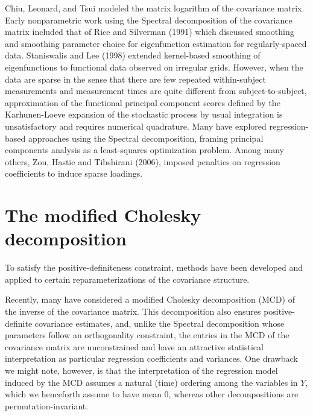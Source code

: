 Chiu, Leonard, and Tsui modeled the matrix logarithm of the covariance matrix. Early nonparametric work using the Spectral decomposition of the covariance matrix included that of Rice and Silverman (1991) which discussed smoothing and smoothing parameter choice for eigenfunction estimation for regularly-spaced data. Staniswalis and Lee (1998) extended kernel-based smoothing of eigenfunctions to functional data observed on irregular grids. However, when the data are sparse in the sense that there are few repeated within-subject measurements and measurement times are quite different from subject-to-subject, approximation of the functional principal component scores defined by the Karhunen-Loeve expansion of the stochastic process by usual integration is unsatisfactory and requires numerical quadrature. Many have explored regression-based approaches using the Spectral decomposition, framing principal components analysis as a least-squares optimization problem. Among many others, Zou, Hastie and Tibshirani (2006), imposed penalties on regression coefficients to induce sparse loadings. 

\section{The modified Cholesky decomposition} 

To satisfy the positive-definiteness constraint, methods have been developed and applied to certain reparameterizations of the covariance structure. 


Recently, many have considered a modified Cholesky decomposition (MCD) of the inverse of the covariance matrix. This decomposition also ensures positive-definite covariance estimates, and, unlike the Spectral decomposition whose parameters follow an orthogonality constraint, the entries in the MCD of the covariance matrix are unconstrained and have an attractive statistical interpretation as particular regression coefficients and variances.  One drawback we might note, however, is that the interpretation of  the regression model induced by the MCD assumes a natural (time) ordering among the variables in $Y$, which we henceforth assume to have mean $0$, whereas other decompositions are permutation-invariant.





  

